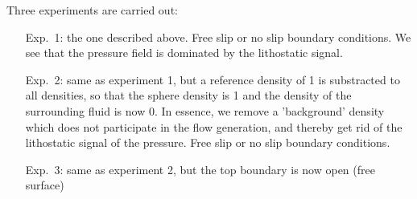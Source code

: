 Three experiments are carried out:
\begin{enumerate}
\item[Exp.~1:] the one described above.
Free slip or no slip boundary conditions.
We see that the pressure field is dominated by the lithostatic signal.
\item[Exp.~2:] same as experiment 1, but a reference density of 1 is substracted to all densities, so that 
the sphere density is 1 and the density of the surrounding fluid is now 0. In essence, we remove a
'background' density which does not participate in the flow generation, and thereby get rid of the 
lithostatic signal of the pressure.
Free slip or no slip boundary conditions.
\item[Exp.~3:] same as experiment 2, but the top boundary is now open (free surface)
\end{enumerate} 

